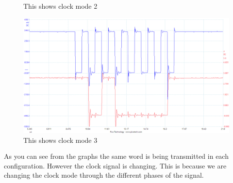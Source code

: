 \documentclass[a4paper,12pt]{scrartcl}
\begin{document}
{{{\begin{figure}[h]
					\caption{This shows clock mode 2}
					\label{img:ClockMode2}
				\end{figure}
				\begin{figure}[h]
					\centering
					\includegraphics[width=\textwidth]{Ex1/mode3}
					\caption{This shows clock mode 3}
					\label{img:ClockMode3}
				\end{figure}
				As you can see from the graphs the same word is being transmitted in each configuration. However the clock signal is changing. This is because we are changing the clock mode through the different phases of the signal.
			}
		
}}
\end{document}
